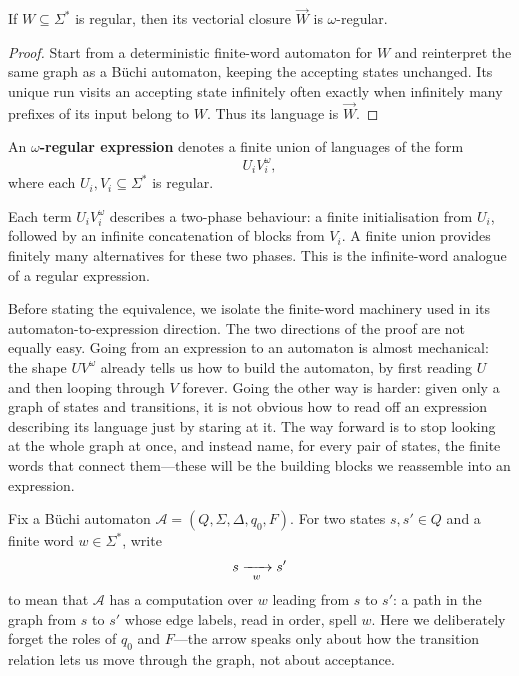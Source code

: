 \begin{corollary}
\label{cor:regular-vectorial-closure}
If $W\subseteq\Sigma^*$ is regular, then its vectorial closure
$\overrightarrow{W}$ is $\omega$-regular.
\end{corollary}

\begin{proof}
Start from a deterministic finite-word automaton for $W$ and reinterpret
the same graph as a B\"uchi automaton, keeping the accepting states
unchanged.  Its unique run
visits an accepting state infinitely often exactly when infinitely many
prefixes of its input belong to $W$.  Thus its language is
$\overrightarrow{W}$.
\end{proof}

\begin{definition}
\label{def:omega-regular-expression}
An \textbf{$\omega$-regular expression} denotes a finite union of
languages of the form
\[
  U_i V_i^\omega,
\]
where each $U_i,V_i\subseteq\Sigma^*$ is regular.
\end{definition}

Each term $U_i V_i^\omega$ describes a two-phase behaviour: a finite
initialisation from $U_i$, followed by an infinite concatenation of blocks
from $V_i$.  A finite union provides finitely many alternatives for these
two phases.  This is the infinite-word analogue of a regular expression.

Before stating the equivalence, we isolate the finite-word machinery used
in its automaton-to-expression direction.  The two directions of the proof
are not equally easy.  Going from an expression to an automaton is almost
mechanical: the shape $UV^\omega$ already tells us how to build the
automaton, by first reading $U$ and then looping through $V$ forever.
Going the other way is harder: given only a graph of states and
transitions, it is not obvious how to read off an expression describing
its language just by staring at it.  The way forward is to stop looking at
the whole graph at once, and instead name, for every pair of states, the
finite words that connect them---these will be the building blocks we
reassemble into an expression.

Fix a B\"uchi automaton $\mathcal{A}=(Q,\Sigma,\Delta,q_0,F)$.  For two
states $s,s'\in Q$ and a finite word $w\in\Sigma^*$, write
\[
  s \xrightarrow[{\;\;w\;\;}]{} s'
\]
to mean that $\mathcal{A}$ has a computation over $w$ leading from $s$ to
$s'$: a path in the graph from $s$ to $s'$ whose edge labels, read in
order, spell $w$.  Here we deliberately forget the roles of $q_0$ and
$F$---the arrow speaks only about how the transition relation lets us
move through the graph, not about acceptance.

